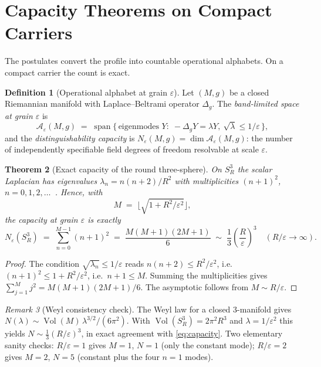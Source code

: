 \documentclass[11pt,a4paper]{article}
\newtheorem{theorem}{Theorem}[section]
\theoremstyle{definition}
\newtheorem{definition}[theorem]{Definition}
\theoremstyle{remark}
\newtheorem{remark}[theorem]{Remark}
\newcommand{\Sthree}{S^{3}}
\begin{document}
\section{Capacity Theorems on Compact Carriers}
\label{sec:capacity}

The postulates convert the profile into countable operational alphabets.  On a compact carrier
the count is exact.

\begin{definition}[Operational alphabet at grain $\varepsilon$]
Let $(M,g)$ be a closed Riemannian manifold with Laplace--Beltrami operator $\Delta_{g}$.  The
\emph{band-limited space at grain $\varepsilon$} is
\begin{equation}
\mathcal A_{\varepsilon}(M,g)\;=\;\operatorname{span}\{\,\text{eigenmodes }Y:\;
-\Delta_{g}Y=\lambda Y,\ \sqrt{\lambda}\le1/\varepsilon\,\},
\end{equation}
and the \emph{distinguishability capacity} is
$N_{\varepsilon}(M,g)=\dim\mathcal A_{\varepsilon}(M,g)$: the number of independently
specifiable field degrees of freedom resolvable at scale $\varepsilon$.
\end{definition}

\begin{theorem}[Exact capacity of the round three-sphere]
\label{thm:capacity}
On $\Sthree_{R}$ the scalar Laplacian has eigenvalues $\lambda_{n}=n(n+2)/R^{2}$ with
multiplicities $(n+1)^{2}$, $n=0,1,2,\dots$~\cite{PB2026susp}.  Hence, with
\begin{equation}
M\;=\;\Big\lfloor\sqrt{1+R^{2}/\varepsilon^{2}}\Big\rfloor ,
\end{equation}
the capacity at grain $\varepsilon$ is exactly
\begin{equation}
N_{\varepsilon}(\Sthree_{R})\;=\;\sum_{n=0}^{M-1}(n+1)^{2}
\;=\;\frac{M(M+1)(2M+1)}{6}
\;\sim\;\frac13\left(\frac{R}{\varepsilon}\right)^{3}
\quad(R/\varepsilon\to\infty).
\label{eq:capacity}
\end{equation}
\end{theorem}

\begin{proof}
The condition $\sqrt{\lambda_{n}}\le1/\varepsilon$ reads $n(n+2)\le R^{2}/\varepsilon^{2}$,
i.e.\ $(n+1)^{2}\le1+R^{2}/\varepsilon^{2}$, i.e.\ $n+1\le M$.  Summing the multiplicities gives
$\sum_{j=1}^{M}j^{2}=M(M+1)(2M+1)/6$.  The asymptotic follows from $M\sim R/\varepsilon$.
\end{proof}

\begin{remark}[Weyl consistency check]
The Weyl law for a closed $3$-manifold gives
$N(\lambda)\sim\operatorname{Vol}(M)\,\lambda^{3/2}/(6\pi^{2})$.  With
$\operatorname{Vol}(\Sthree_{R})=2\pi^{2}R^{3}$ and $\lambda=1/\varepsilon^{2}$ this yields
$N\sim\tfrac13(R/\varepsilon)^{3}$, in exact agreement with \eqref{eq:capacity}.  Two elementary
sanity checks: $R/\varepsilon=1$ gives $M=1$, $N=1$ (only the constant mode); $R/\varepsilon=2$
gives $M=2$, $N=5$ (constant plus the four $n=1$ modes).
\end{remark}
\end{document}
